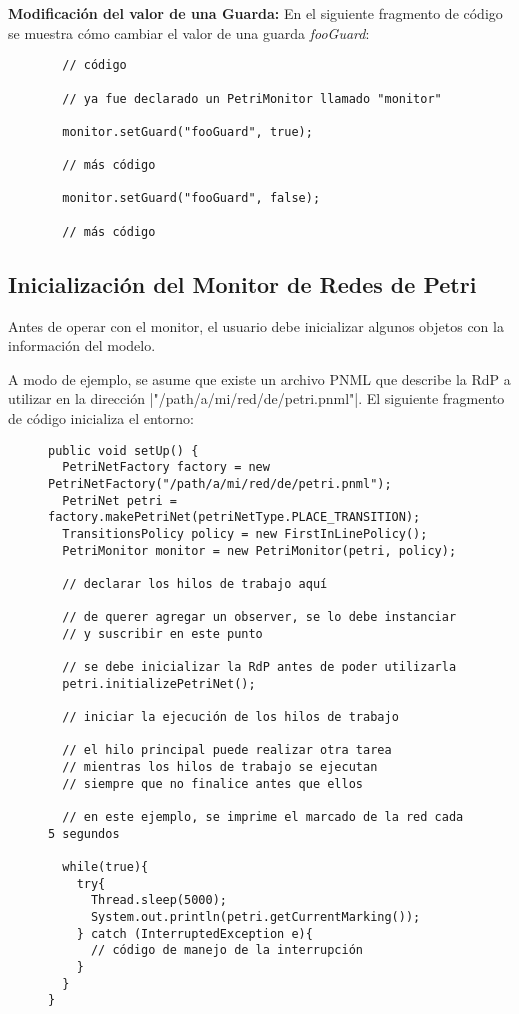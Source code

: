 \textbf{Modificación del valor de una Guarda:} En el siguiente fragmento de
código se muestra cómo cambiar el valor de una guarda \textit{fooGuard}:

\begin{figure}[H]
\centering
\begin{verbatim}
  // código
  
  // ya fue declarado un PetriMonitor llamado "monitor"
  
  monitor.setGuard("fooGuard", true);
  
  // más código
  
  monitor.setGuard("fooGuard", false);
  
  // más código
\end{verbatim}
\end{figure}

\subsection{Inicialización del Monitor de Redes de Petri}

Antes de operar con el monitor, el usuario debe inicializar algunos
objetos con la información del modelo.

A modo de ejemplo, se asume que existe un archivo PNML que describe la RdP a
utilizar en la dirección |"/path/a/mi/red/de/petri.pnml"|. El
siguiente fragmento de código inicializa  el entorno:

\begin{figure}[H]
\centering
\begin{verbatim}
public void setUp() {
  PetriNetFactory factory = new PetriNetFactory("/path/a/mi/red/de/petri.pnml");
  PetriNet petri = factory.makePetriNet(petriNetType.PLACE_TRANSITION);
  TransitionsPolicy policy = new FirstInLinePolicy();
  PetriMonitor monitor = new PetriMonitor(petri, policy);
  
  // declarar los hilos de trabajo aquí
  
  // de querer agregar un observer, se lo debe instanciar
  // y suscribir en este punto
  
  // se debe inicializar la RdP antes de poder utilizarla
  petri.initializePetriNet();
  
  // iniciar la ejecución de los hilos de trabajo
  
  // el hilo principal puede realizar otra tarea
  // mientras los hilos de trabajo se ejecutan
  // siempre que no finalice antes que ellos
  
  // en este ejemplo, se imprime el marcado de la red cada 5 segundos
  
  while(true){
    try{
      Thread.sleep(5000);
      System.out.println(petri.getCurrentMarking());
    } catch (InterruptedException e){
      // código de manejo de la interrupción
    }
  }
}
\end{verbatim}
\end{figure}

